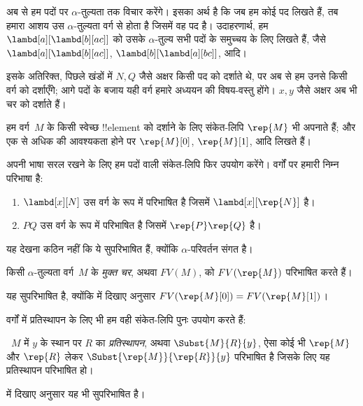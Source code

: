 \documentclass[../../../include/open-logic-section]{subfiles}
\begin{document}

अब से हम पदों पर $\alpha$-तुल्यता तक विचार करेंगे। इसका अर्थ है कि जब हम
कोई पद लिखते हैं, तब हमारा आशय उस $\alpha$-तुल्यता वर्ग से होता है जिसमें
वह पद है। उदाहरणार्थ, हम $\lambd[a][\lambd[b][a c]]$ को उसके
$\alpha$-तुल्य सभी पदों के समुच्चय के लिए लिखते हैं, जैसे
$\lambd[a][\lambd[b][a c]]$, $\lambd[b][\lambd[a][b c]]$, आदि।

इसके अतिरिक्त, पिछले खंडों में $N, Q$ जैसे अक्षर किसी पद को दर्शाते थे,
पर अब से हम उनसे किसी वर्ग को दर्शाएँगे; आगे पदों के बजाय यही वर्ग हमारे
अध्ययन की विषय-वस्तु होंगे। $x, y$ जैसे अक्षर अब भी चर को दर्शाते हैं।

हम वर्ग~$M$ के किसी स्वेच्छ !!{element} को दर्शाने के लिए संकेत-लिपि
$\rep{M}$ भी अपनाते हैं; और एक से अधिक की आवश्यकता होने पर $\rep{M}[0]$,
$\rep{M}[1]$, आदि लिखते हैं।

अपनी भाषा सरल रखने के लिए हम पदों वाली संकेत-लिपि फिर उपयोग करेंगे। वर्गों
पर हमारी निम्न परिभाषा है:
\begin{defn}
  \begin{enumerate}
  \item $\lambd[x][N]$ उस वर्ग के रूप में परिभाषित है जिसमें
    $\lambd[x][\rep{N}]$ है।
  \item $PQ$ उस वर्ग के रूप में परिभाषित है जिसमें $\rep{P}\rep{Q}$ है।
  \end{enumerate}
\end{defn}

यह देखना कठिन नहीं कि ये सुपरिभाषित हैं, क्योंकि $\alpha$-परिवर्तन संगत
है।

\begin{defn} 
  किसी $\alpha$-तुल्यता वर्ग~$M$ के \emph{मुक्त चर}, अथवा $FV(M)$, को
  $FV(\rep{M})$ परिभाषित करते हैं।
\end{defn}

यह सुपरिभाषित है, क्योंकि  में दिखाए अनुसार
$FV(\rep{M}[0]) = FV(\rep{M}[1])$।

वर्गों में प्रतिस्थापन के लिए भी हम वही संकेत-लिपि पुनः उपयोग करते हैं:
\begin{defn} 
  ~$M$ में $y$ के स्थान पर $R$ का \emph{प्रतिस्थापन}, अथवा
  $\Subst{M}{R}{y}$, ऐसा कोई भी $\rep{M}$ और $\rep{R}$ लेकर
  $\Subst{\rep{M}}{\rep{R}}{y}$ परिभाषित है जिसके लिए यह प्रतिस्थापन
  परिभाषित हो।
\end{defn}

 में दिखाए अनुसार यह भी सुपरिभाषित है।
\end{document}
